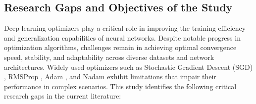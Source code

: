 \documentclass{article}
\begin{document}
%
%
%



\subsection{Research Gaps and Objectives of the Study}

Deep learning optimizers play a critical role in improving the training efficiency and generalization capabilities of neural networks. Despite notable progress in optimization algorithms, challenges remain in achieving optimal convergence speed, stability, and adaptability across diverse datasets and network architectures. Widely used optimizers such as Stochastic Gradient Descent (SGD) \cite{Robbins1951}, RMSProp \cite{Tieleman2012}, Adam \cite{kingma2014adam}, and Nadam \cite{Dozat2016} exhibit limitations that impair their performance in complex scenarios. This study identifies the following critical research gaps in the current literature:
\end{document}
